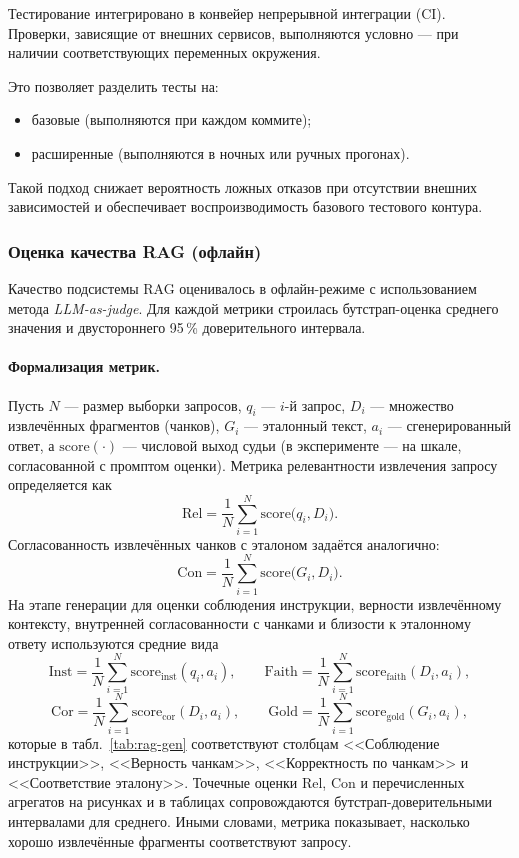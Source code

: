 \documentclass{article}
\begin{document}
Тестирование интегрировано в конвейер непрерывной интеграции (CI). Проверки, зависящие от внешних сервисов, выполняются условно — при наличии соответствующих переменных окружения.

Это позволяет разделить тесты на:
\begin{itemize}
\item базовые (выполняются при каждом коммите);
\item расширенные (выполняются в ночных или ручных прогонах).
\end{itemize}

Такой подход снижает вероятность ложных отказов при отсутствии внешних зависимостей и обеспечивает воспроизводимость базового тестового контура.

\subsubsection{Оценка качества RAG (офлайн)}

Качество подсистемы RAG оценивалось в офлайн-режиме с использованием метода \emph{LLM-as-judge}. Для каждой метрики строилась бутстрап-оценка среднего значения и двустороннего 95\,\% доверительного интервала.

\paragraph{Формализация метрик.}
Пусть $N$ --- размер выборки запросов, $q_i$ --- $i$-й запрос, $D_i$ --- множество извлечённых фрагментов (чанков), $G_i$ --- эталонный текст, $a_i$ --- сгенерированный ответ, а $\mathrm{score}(\cdot)$ --- числовой выход судьи (в эксперименте --- на шкале, согласованной с промптом оценки). Метрика релевантности извлечения запросу определяется как
\[
\mathrm{Rel} = \frac{1}{N}\sum_{i=1}^{N} \mathrm{score}\bigl(q_i, D_i\bigr).
\]
Согласованность извлечённых чанков с эталоном задаётся аналогично:
\[
\mathrm{Con} = \frac{1}{N}\sum_{i=1}^{N} \mathrm{score}\bigl(G_i, D_i\bigr).
\]
На этапе генерации для оценки соблюдения инструкции, верности извлечённому контексту, внутренней согласованности с чанками и близости к эталонному ответу используются средние вида
\[
\mathrm{Inst} = \frac{1}{N}\sum_{i=1}^{N} \mathrm{score}_{\mathrm{inst}}(q_i, a_i),\qquad
\mathrm{Faith} = \frac{1}{N}\sum_{i=1}^{N} \mathrm{score}_{\mathrm{faith}}(D_i, a_i),
\]
\[
\mathrm{Cor} = \frac{1}{N}\sum_{i=1}^{N} \mathrm{score}_{\mathrm{cor}}(D_i, a_i),\qquad
\mathrm{Gold} = \frac{1}{N}\sum_{i=1}^{N} \mathrm{score}_{\mathrm{gold}}(G_i, a_i),
\]
которые в табл.~\ref{tab:rag-gen} соответствуют столбцам <<Соблюдение инструкции>>, <<Верность чанкам>>, <<Корректность по чанкам>> и <<Соответствие эталону>>. Точечные оценки $\mathrm{Rel}$, $\mathrm{Con}$ и перечисленных агрегатов на рисунках и в таблицах сопровождаются бутстрап-доверительными интервалами для среднего. Иными словами, метрика показывает, насколько хорошо извлечённые фрагменты соответствуют запросу.
\end{document}
